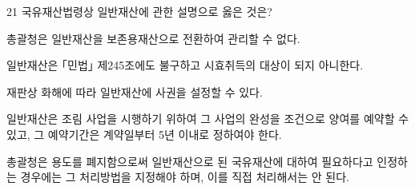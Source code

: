 \begin{question}{21}
국유재산법령상 일반재산에 관한 설명으로 옳은 것은?
\begin{choices}
  \item 총괄청은 일반재산을 보존용재산으로 전환하여 관리할 수 없다.
  \item 일반재산은 ｢민법｣ 제245조에도 불구하고 시효취득의 대상이 되지 아니한다.
  \item 재판상 화해에 따라 일반재산에 사권을 설정할 수 있다.
  \item 일반재산은 조림 사업을 시행하기 위하여 그 사업의 완성을 조건으로 양여를 예약할 수 있고, 그 예약기간은 계약일부터 5년 이내로 정하여야 한다.
  \item 총괄청은 용도를 폐지함으로써 일반재산으로 된 국유재산에 대하여 필요하다고 인정하는 경우에는 그 처리방법을 지정해야 하며, 이를 직접 처리해서는 안 된다.
\end{choices}
\end{question}
